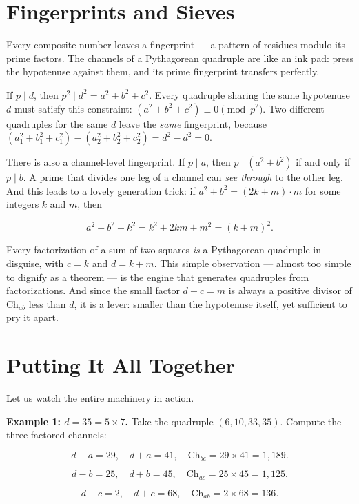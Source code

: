 \documentclass[11pt,twoside,openright]{book}
\theoremstyle{definition}
\theoremstyle{remark}
\begin{document}
\section{Fingerprints and Sieves}

Every composite number leaves a fingerprint --- a pattern of residues modulo its prime factors. The channels of a Pythagorean quadruple are like an ink pad: press the hypotenuse against them, and its prime fingerprint transfers perfectly.

If $p \mid d$, then $p^2 \mid d^2 = a^2 + b^2 + c^2$. Every quadruple sharing the same hypotenuse $d$ must satisfy this constraint: $(a^2 + b^2 + c^2) \equiv 0 \pmod{p^2}$. Two different quadruples for the same $d$ leave the \textit{same} fingerprint, because $(a_1^2 + b_1^2 + c_1^2) - (a_2^2 + b_2^2 + c_2^2) = d^2 - d^2 = 0$.

There is also a channel-level fingerprint. If $p \mid a$, then $p \mid (a^2 + b^2)$ if and only if $p \mid b$. A prime that divides one leg of a channel can \textit{see through} to the other leg. And this leads to a lovely generation trick: if $a^2 + b^2 = (2k + m) \cdot m$ for some integers $k$ and $m$, then

\[a^2 + b^2 + k^2 = k^2 + 2km + m^2 = (k + m)^2.\]

Every factorization of a sum of two squares \textit{is} a Pythagorean quadruple in disguise, with $c = k$ and $d = k + m$. This simple observation --- almost too simple to dignify as a theorem --- is the engine that generates quadruples from factorizations. And since the small factor $d - c = m$ is always a positive divisor of $\mathrm{Ch}_{ab}$ less than $d$, it is a lever: smaller than the hypotenuse itself, yet sufficient to pry it apart.



\section{Putting It All Together}

Let us watch the entire machinery in action.

\textbf{Example 1: $d = 35 = 5 \times 7$.} Take the quadruple $(6, 10, 33, 35)$. Compute the three factored channels:

\[d - a = 29, \quad d + a = 41, \quad \mathrm{Ch}_{bc} = 29 \times 41 = 1{,}189.\]

\[d - b = 25, \quad d + b = 45, \quad \mathrm{Ch}_{ac} = 25 \times 45 = 1{,}125.\]

\[d - c = 2, \quad d + c = 68, \quad \mathrm{Ch}_{ab} = 2 \times 68 = 136.\]
\end{document}
